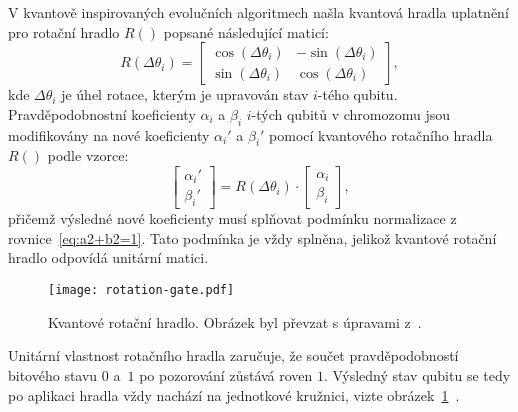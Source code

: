 V kvantově inspirovaných evolučních algoritmech našla kvantová hradla uplatnění pro rotační hradlo $R\left(\right)$ popsané následující maticí:
\begin{equation}\label{eq:rotate-gate}
    R\left(\Delta\theta_i\right) =
    \begin{bmatrix}
        \cos{\left( \Delta\theta_i \right)} & - \sin{\left( \Delta\theta_i \right)} \\
        \sin{\left( \Delta\theta_i \right)} &   \cos{\left( \Delta\theta_i \right)}
    \end{bmatrix},
\end{equation}
kde $\Delta\theta_i$ je úhel rotace, kterým je upravován stav $i$-tého qubitu. 
Pravděpodobnostní koeficienty $\alpha_i$ a $\beta_i$ $i$-tých qubitů v chromozomu jsou modifikovány na nové koeficienty $\alpha_i'$ a $\beta_i'$ pomocí kvantového rotačního hradla $R\left(\right)$ podle vzorce: 
\begin{equation}\label{eq:rotation-gate-angles}
    \begin{bmatrix}
        \alpha_i' \\
        \beta_i' 
    \end{bmatrix}
    =
    R\left(\Delta\theta_i\right) \cdot
    \begin{bmatrix}
        \alpha_i \\
        \beta_i 
    \end{bmatrix},
\end{equation}
přičemž výsledné nové koeficienty musí splňovat podmínku normalizace z rovnice~\ref{eq:a2+b2=1}. 
Tato podmínka je vždy splněna, jelikož kvantové rotační hradlo odpovídá unitární matici. 
\begin{figure}[ht!]
    \centering
    \texttt{[image: rotation-gate.pdf]}
    \caption{Kvantové rotační hradlo. Obrázek byl převzat s úpravami z~\cite{NaturalComputing}.}
    \label{fig:rotation-gate}
\end{figure}
Unitární vlastnost rotačního hradla zaručuje, že součet pravděpodobností bitového stavu $0$ a~$1$ po pozorování zůstává roven $1$. 
Výsledný stav qubitu se tedy po aplikaci hradla vždy nachází na jednotkové kružnici, vizte obrázek~\ref{fig:rotation-gate}~\cite{NaturalComputing}.

